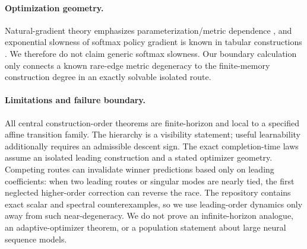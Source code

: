 \paragraph{Optimization geometry.}
Natural-gradient theory emphasizes parameterization/metric dependence \citep{amari1998natural}, and exponential slowness of softmax policy gradient is known in tabular constructions \citep{li2023softmax}. We therefore do not claim generic softmax slowness. Our boundary calculation only connects a known rare-edge metric degeneracy to the finite-memory construction degree in an exactly solvable isolated route.

\paragraph{Limitations and failure boundary.}
All central construction-order theorems are finite-horizon and local to a specified affine transition family. The hierarchy is a visibility statement; useful learnability additionally requires an admissible descent sign. The exact completion-time laws assume an isolated leading construction and a stated optimizer geometry. Competing routes can invalidate winner predictions based only on leading coefficients: when two leading routes or singular modes are nearly tied, the first neglected higher-order correction can reverse the race. The repository contains exact scalar and spectral counterexamples, so we use leading-order dynamics only away from such near-degeneracy. We do not prove an infinite-horizon analogue, an adaptive-optimizer theorem, or a population statement about large neural sequence models.
